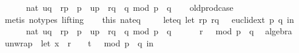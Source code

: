 \begin{isabellebody}
\ \ \ \ \ \ nat\ {\isacharparenleft}{\kern0pt}{\isacharparenleft}{\kern0pt}{\isacharquery}{\kern0pt}uq\ {\isacharasterisk}{\kern0pt}\ r{\isacharunderscore}{\kern0pt}p\ {\isacharasterisk}{\kern0pt}\ p\ {\isacharplus}{\kern0pt}\ {\isacharquery}{\kern0pt}up\ {\isacharasterisk}{\kern0pt}\ r{\isacharunderscore}{\kern0pt}q\ {\isacharasterisk}{\kern0pt}\ q{\isacharparenright}{\kern0pt}\ mod\ {\isacharparenleft}{\kern0pt}p\ {\isacharasterisk}{\kern0pt}\ q{\isacharparenright}{\kern0pt}{\isacharparenright}{\kern0pt}{\isacharparenright}{\kern0pt}{\isachardoublequoteclose}\isanewline
\ \ \isamarkupfalse%
\ old{\isachardot}{\kern0pt}prod{\isachardot}{\kern0pt}case\isanewline
\ \ \isamarkupfalse%
\ {\isacharparenleft}{\kern0pt}metis\ {\isacharparenleft}{\kern0pt}no{\isacharunderscore}{\kern0pt}types{\isacharcomma}{\kern0pt}\ lifting{\isacharparenright}{\kern0pt}{\isacharparenright}{\kern0pt}\isanewline
\isanewline
\ \ \isamarkupfalse%
\ this\ nat{\isacharunderscore}{\kern0pt}eq\ \isanewline
\ \ \isamarkupfalse%
\ let{\isacharunderscore}{\kern0pt}eq{\isacharcolon}{\kern0pt}\ {\isachardoublequoteopen}{\isacharparenleft}{\kern0pt}let\ {\isacharparenleft}{\kern0pt}{\isacharparenleft}{\kern0pt}r{\isacharunderscore}{\kern0pt}p{\isacharcomma}{\kern0pt}\ r{\isacharunderscore}{\kern0pt}q{\isacharparenright}{\kern0pt}{\isacharcomma}{\kern0pt}\ {\isacharunderscore}{\kern0pt}{\isacharparenright}{\kern0pt}\ {\isacharequal}{\kern0pt}\ euclid{\isacharunderscore}{\kern0pt}ext\ p\ q\ in\ \isanewline
\ \ \ \ \ \ nat\ {\isacharparenleft}{\kern0pt}{\isacharparenleft}{\kern0pt}{\isacharquery}{\kern0pt}uq\ {\isacharasterisk}{\kern0pt}\ r{\isacharunderscore}{\kern0pt}p\ {\isacharasterisk}{\kern0pt}\ p\ {\isacharplus}{\kern0pt}\ {\isacharquery}{\kern0pt}up\ {\isacharasterisk}{\kern0pt}\ r{\isacharunderscore}{\kern0pt}q\ {\isacharasterisk}{\kern0pt}\ q{\isacharparenright}{\kern0pt}\ mod\ {\isacharparenleft}{\kern0pt}p\ {\isacharasterisk}{\kern0pt}\ q{\isacharparenright}{\kern0pt}{\isacharparenright}{\kern0pt}{\isacharparenright}{\kern0pt}\isanewline
\ \ \ \ \ \ {\isacharequal}{\kern0pt}r\ {\isacharcircum}{\kern0pt}\ {}\ mod\ {\isacharparenleft}{\kern0pt}p\ {\isacharasterisk}{\kern0pt}\ q{\isacharparenright}{\kern0pt}{\isachardoublequoteclose}\ \isamarkupfalse%
\ algebra\isanewline
\isanewline
\isanewline
\ \ \isamarkupfalse%
\ unwrap{\isacharcolon}{\kern0pt}\ {\isachardoublequoteopen}\ {\isacharparenleft}{\kern0pt}let\ x\ {\isacharequal}{\kern0pt}\ r\ {\isacharcircum}{\kern0pt}\ {\isacharparenleft}{\kern0pt}{}\ {\isacharcircum}{\kern0pt}\ {\isacharparenleft}{\kern0pt}t\ {\isacharplus}{\kern0pt}\ {}{\isacharparenright}{\kern0pt}{\isacharparenright}{\kern0pt}\ mod\ {\isacharparenleft}{\kern0pt}p\ {\isacharasterisk}{\kern0pt}\ q{\isacharparenright}{\kern0pt}\ in\isanewline

\end{isabellebody}
